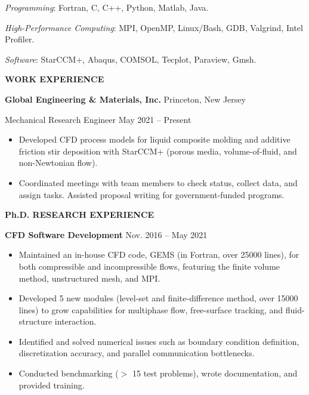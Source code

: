 \documentclass[11pt, letterpaper]{article}
\begin{document}
\fullrule

\textit{Programming}: Fortran, C, C++, Python, Matlab, Java.

\textit{High-Performance Computing}: MPI, OpenMP, Linux/Bash, GDB, Valgrind, Intel Profiler.

\textit{Software}: StarCCM+, Abaqus, COMSOL, Tecplot, Paraview, Gmsh. 



\vspace{9pt}

\textbf{WORK EXPERIENCE}

\fullrule

\textbf{Global Engineering \& Materials, Inc.} \hfill Princeton, New Jersey

Mechanical Research Engineer \hfill May 2021 -- Present

\begin{itemize}[leftmargin=*, labelsep=5mm]
   \item Developed CFD process models for liquid composite molding and additive friction stir
      deposition with StarCCM+ (porous media, volume-of-fluid, and non-Newtonian flow).
   \item Coordinated meetings with team members to check status, collect data, and assign tasks.
      Assisted proposal writing for government-funded programs.
\end{itemize}

\vspace{3pt}

\textbf{Ph.D. RESEARCH EXPERIENCE}

\fullrule

\textbf{CFD Software Development} \hfill Nov. 2016 -- May 2021
\begin{itemize}[leftmargin=*, labelsep=5mm]
   \item Maintained an in-house CFD code, GEMS (in Fortran, over 25000 lines), for both compressible
      and incompressible flows, featuring the finite volume method, unstructured mesh, and MPI.
   \item Developed 5 new modules (level-set and finite-difference method, over 15000 lines) to grow
      capabilities for multiphase flow, free-surface tracking, and fluid-structure interaction.
   \item Identified and solved numerical issues such as boundary condition definition,
      discretization accuracy, and parallel communication bottlenecks.
   \item Conducted benchmarking ($>$ 15 test problems), wrote documentation, and provided training.
\end{itemize}
\end{document}
